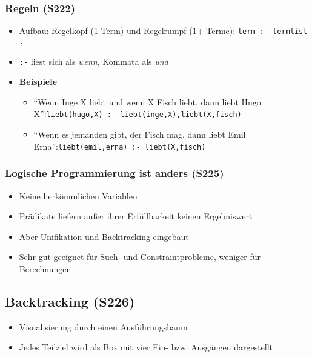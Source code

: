 \subsubsection{Regeln (S222)}
\begin{itemize}
	\item Aufbau: Regelkopf (1 Term) und Regelrumpf (1+ Terme): \texttt{term :- termlist .}
	\item \texttt{:-} liest sich als \textit{wenn}, Kommata als \textit{und}
	\item \textbf{Beispiele}
	\begin{itemize}
		\item "`Wenn Inge X liebt und wenn X Fisch liebt, dann liebt Hugo X"':\newline\texttt{liebt(hugo,X) :- liebt(inge,X),liebt(X,fisch)}
		\item "`Wenn es jemanden gibt, der Fisch mag, dann liebt Emil Erna"':\newline\texttt{liebt(emil,erna) :- liebt(X,fisch)}
	\end{itemize}
\end{itemize}

\subsubsection{Logische Programmierung ist anders (S225)}
\begin{itemize}
	\item Keine herkömmlichen Variablen
	\item Prädikate liefern außer ihrer Erfüllbarkeit keinen Ergebniswert
	\item Aber Unifikation und Backtracking eingebaut
	\item Sehr gut geeignet für Such- und Constraintprobleme, weniger für Berechnungen
\end{itemize}


\subsection{Backtracking (S226)}
\begin{itemize}
	\item Visualisierung durch einen Ausführungsbaum
	\item Jedes Teilziel wird als Box mit vier Ein- bzw. Ausgängen dargestellt
\end{itemize}

